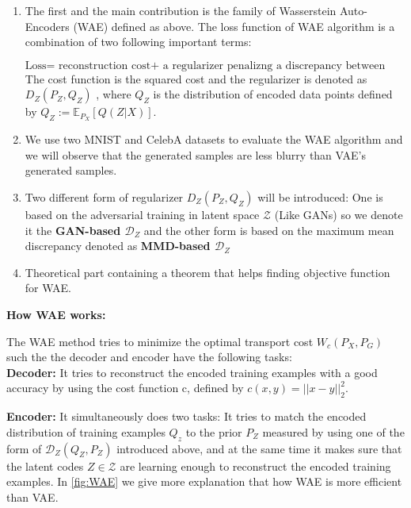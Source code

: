 \documentclass[12pt,english]{amsart}
\theoremstyle{definition}
\begin{document}
\begin{enumerate}
  \item The first and the main contribution is the family of Wasserstein
        Auto-Encoders (WAE) defined as above. The loss function of WAE algorithm
        is a combination of two following important terms:

$$\text{Loss= reconstruction cost+ a regularizer penalizng a discrepancy between distributions}$$
The cost function is the squared cost and the regularizer is denoted as
$D_{Z}(P_Z, Q_Z)$ , where $Q_Z$ is the distribution of encoded data points
defined by $Q_Z:= \mathbb{E}_{P_X} \left[Q(Z|X) \right]$.

  \item We use two MNIST and CelebA datasets to evaluate the WAE algorithm and we
        will observe that the generated samples are less blurry than VAE's generated
        samples.

  \item Two different form of regularizer $D_Z(P_Z, Q_Z)$ will be introduced: One
        is based on the adversarial training in latent space $\mathcal{Z}$ (Like
        GANs) so we denote it the \textbf{ GAN-based $\mathcal{D}_Z$} and the
        other form is based on the maximum mean discrepancy denoted as
        \textbf{MMD-based $\mathcal{D}_Z $}

  \item Theoretical part containing a theorem that helps finding objective
        function for WAE.

\end{enumerate}

\textbf{How WAE works:}

The WAE method tries to minimize the optimal transport cost $W_c(P_X, P_G)$ such
the the decoder and encoder have the following tasks:\\

\textbf{Decoder:} It tries to reconstruct the encoded training examples with a
good accuracy by using the cost function c, defined by $c(x,y)= ||x-y||_2^2$.

\textbf{Encoder:} It simultaneously does two tasks: It tries to match the encoded
distribution of training examples $Q_z$ to the prior $P_Z$ measured by using one
of the form of $\mathcal{D}_Z(Q_Z,P_Z)$ introduced above, and at the same time it
makes sure that the latent codes $Z \in \mathcal{Z}$ are learning enough to
reconstruct the encoded training examples.  In \ref{fig:WAE} we give more explanation
that how WAE is more efficient than VAE.
\end{document}
